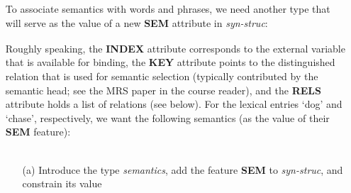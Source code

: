 \documentclass[10pt]{article}
\newcommand{\att}[1]{{\mbox{\scriptsize {\bf #1}}}}
\begin{document}
\begin{enumerate}
\begin{itemize}
                {\it object} and {\it event}, which we will use to
                represent variables in role assignment.
          \item [(b)]
                Add the types {\it relation} through
                {\it arg1-2-3-relation} (as shown above) below 
                {\it feat-struc}.
        \end{itemize}
  \item []
        To associate semantics with words and phrases, we need another
        type that will serve as the value of a new \att{SEM} attribute
        in {\it syn-struc}:\\
        \verb|  |%
        \\
        Roughly speaking, the \att{INDEX} attribute corresponds to the
        external variable that is available for binding, the \att{KEY}
        attribute points to the distinguished relation that is used for
        semantic selection (typically contributed by the semantic head;
        see the MRS paper in the course reader), and the \att{RELS}
        attribute holds a list of relations (see below).
        For the lexical entries `dog' and `chase', respectively, we want
        the following semantics (as the value of their \att{SEM}
        feature):\\ 
         \\
        \begin{itemize}
          \item [(a)]
                Introduce the type {\it semantics}, add the feature
                \att{SEM} to {\it syn-struc}, and constrain its value

\end{itemize}
\end{enumerate}
\end{document}
